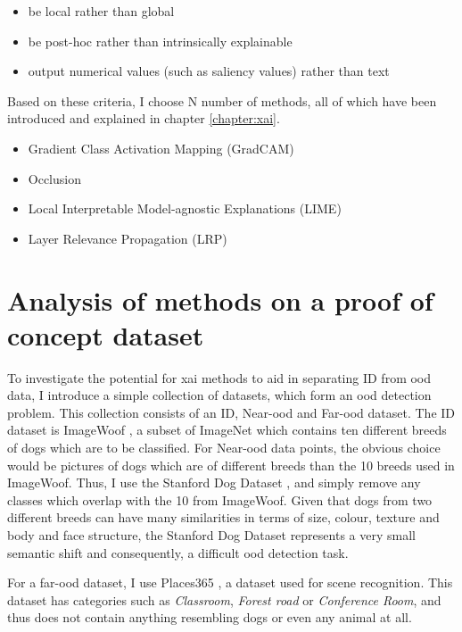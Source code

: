 \documentclass[UKenglish]{uiomasterthesis} %
\theoremstyle{definition}
\begin{document}
\begin{itemize}
    \item be local rather than global
    \item be post-hoc rather than intrinsically explainable
    \item output numerical values (such as saliency values) rather than text
\end{itemize}

Based on these criteria, I choose N number of methods, all of which have been introduced and explained in chapter \ref{chapter:xai}.

\begin{itemize}
    \item Gradient Class Activation Mapping (GradCAM)
    \item Occlusion
    \item Local Interpretable Model-agnostic Explanations (LIME)
    \item Layer Relevance Propagation (LRP)
\end{itemize}

\section{Analysis of methods on a proof of concept dataset}

To investigate the potential for \ac{xai} methods to aid in separating ID from \ac{ood} data, I introduce a simple collection of datasets, which form an \ac{ood} detection problem. This collection consists of an ID, Near-\ac{ood} and Far-\ac{ood} dataset. The ID dataset is ImageWoof \cite{imagewoof}, a subset of ImageNet which contains ten different breeds of dogs which are to be classified. For Near-\ac{ood} data points, the obvious choice would be pictures of dogs which are of different breeds than the 10 breeds used in ImageWoof. Thus, I use the Stanford Dog Dataset \cite{stanforddogs}, and simply remove any classes which overlap with the 10 from ImageWoof. Given that dogs from two different breeds can have many similarities in terms of size, colour, texture and body and face structure, the Stanford Dog Dataset represents a very small semantic shift and consequently, a difficult \ac{ood} detection task.

For a far-\ac{ood} dataset, I use Places365 \cite{places365}, a dataset used for scene recognition. This dataset has categories such as {\it Classroom}, {\it Forest road} or {\it Conference Room}, and thus does not contain anything resembling dogs or even any animal at all. 
\end{document}

